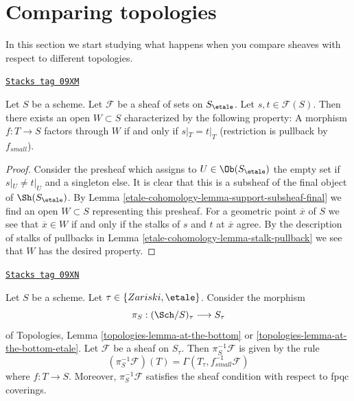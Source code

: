 \section{Comparing topologies}
\label{etale-cohomology-section-compare-topologies}
In this section we start studying what happens when you compare
sheaves with respect to different topologies.

\begin{lemma}
\label{etale-cohomology-lemma-where-sections-are-equal}
\href{https://stacks.math.columbia.edu/tag/09XM}{\texttt{Stacks tag 09XM}}

Let $S$ be a scheme. Let $\mathcal{F}$ be a sheaf of sets on $S_\etale$.
Let $s, t \in \mathcal{F}(S)$. Then there exists an open $W \subset S$
characterized by the following property: A morphism $f : T \to S$
factors through $W$ if and only if $s|_T = t|_T$ (restriction is
pullback by $f_{small}$).
\end{lemma}

\begin{proof}
Consider the presheaf which assigns to $U \in \Ob(S_\etale)$ the empty set
if $s|_U \not = t|_U$ and a singleton else. It is clear that this is
a subsheaf of the final object of $\Sh(S_\etale)$. By
Lemma \ref{etale-cohomology-lemma-support-subsheaf-final}
we find an open $W \subset S$ representing this presheaf.
For a geometric point $\overline{x}$ of $S$ we see that $\overline{x} \in W$
if and only if the stalks of $s$ and $t$ at $\overline{x}$ agree.
By the description of stalks of pullbacks in
Lemma \ref{etale-cohomology-lemma-stalk-pullback}
we see that $W$ has the desired property.
\end{proof}

\begin{lemma}
\label{etale-cohomology-lemma-describe-pullback}
\href{https://stacks.math.columbia.edu/tag/09XN}{\texttt{Stacks tag 09XN}}

Let $S$ be a scheme. Let $\tau \in \{Zariski, \etale\}$. Consider the morphism
$$
\pi_S : (\Sch/S)_\tau \longrightarrow S_\tau
$$
of Topologies, Lemma \ref{topologies-lemma-at-the-bottom} or
\ref{topologies-lemma-at-the-bottom-etale}. Let $\mathcal{F}$ be a sheaf on
$S_\tau$. Then $\pi_S^{-1}\mathcal{F}$ is given by the rule
$$
(\pi_S^{-1}\mathcal{F})(T) = \Gamma(T_\tau, f_{small}^{-1}\mathcal{F})
$$
where $f : T \to S$. Moreover, $\pi_S^{-1}\mathcal{F}$ satisfies the
sheaf condition with respect to fpqc coverings.
\end{lemma}

